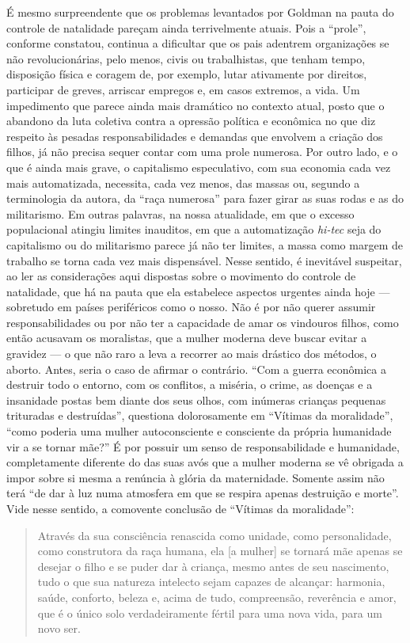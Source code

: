 É mesmo surpreendente que os problemas levantados por Goldman na pauta
do controle de natalidade pareçam ainda terrivelmente atuais. Pois a
``prole'', conforme constatou, continua a dificultar que os pais
adentrem organizações se não revolucionárias, pelo menos, civis ou
trabalhistas, que tenham tempo, disposição física e coragem de, por
exemplo, lutar ativamente por direitos, participar de greves, arriscar
empregos e, em casos extremos, a vida. Um impedimento que parece ainda
mais dramático no contexto atual, posto que o abandono da luta coletiva
contra a opressão política e econômica no que diz respeito às pesadas
responsabilidades e demandas que envolvem a criação dos filhos, já não
precisa sequer contar com uma prole numerosa. Por outro lado, e o que é
ainda mais grave, o capitalismo especulativo, com sua economia cada vez
mais automatizada, necessita, cada vez menos, das massas ou, segundo a
terminologia da autora, da ``raça numerosa'' para fazer girar as suas
rodas e as do militarismo. Em outras palavras, na nossa atualidade, em
que o excesso populacional atingiu limites inauditos, em que a
automatização \emph{hi-tec} seja do capitalismo ou do militarismo parece
já não ter limites, a massa como margem de trabalho se torna cada vez
mais dispensável. Nesse sentido, é inevitável suspeitar, ao ler as
considerações aqui dispostas sobre o movimento do controle de
natalidade, que há na pauta que ela estabelece aspectos urgentes ainda
hoje --- sobretudo em países periféricos como o nosso. Não é por não
querer assumir responsabilidades ou por não ter a capacidade de amar os
vindouros filhos, como então acusavam os moralistas, que a mulher
moderna deve buscar evitar a gravidez --- o que não raro a leva a
recorrer ao mais drástico dos métodos, o aborto. Antes, seria o caso de
afirmar o contrário. ``Com a guerra econômica a destruir todo o entorno,
com os conflitos, a miséria, o crime, as doenças e a insanidade postas
bem diante dos seus olhos, com inúmeras crianças pequenas trituradas e
destruídas'', questiona dolorosamente em ``Vítimas da moralidade'',
``como poderia uma mulher autoconsciente e consciente da própria
humanidade vir a se tornar mãe?'' É por possuir um senso de
responsabilidade e humanidade, completamente diferente do das suas avós
que a mulher moderna se vê obrigada a impor sobre si mesma a renúncia à
glória da maternidade. Somente assim não terá ``de dar à luz numa
atmosfera em que se respira apenas destruição e morte''. Vide nesse
sentido, a comovente conclusão de ``Vítimas da moralidade'':

\begin{quote}
Através da sua consciência renascida como unidade, como personalidade,
como construtora da raça humana, ela {[}a mulher{]} se tornará mãe
apenas se desejar o filho e se puder dar à criança, mesmo antes de seu
nascimento, tudo o que sua natureza intelecto sejam capazes de alcançar:
harmonia, saúde, conforto, beleza e, acima de tudo, compreensão,
reverência e amor, que é o único solo verdadeiramente fértil para uma
nova vida, para um novo ser.
\end{quote}

